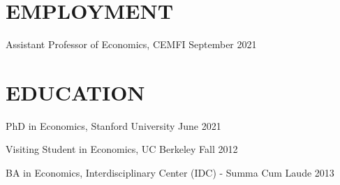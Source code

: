 \documentclass[margin]{res} %
\begin{document}
\begin{resume}


\section{EMPLOYMENT}

Assistant Professor of Economics, CEMFI \hfill September 2021


\section{EDUCATION}

PhD in Economics, Stanford University \hfill June 2021

Visiting Student in Economics, UC Berkeley  \hfill Fall 2012 

BA in Economics, Interdisciplinary Center (IDC) - Summa Cum Laude \hfill 2013

\begin{comment}
\section{DISSERTATION COMMITTEE}


\begin{multicols}{2}
	\begin{itemize}
		 \item[] Prof. Ran Abramitzky (Primary) \\
		Economics Department, Stanford University \\
		(650) 723-9276 \\
		\textcolor{blue}{ranabra@stanford.edu} \\

		 \item[] Asst. Prof. Petra Persson \\
		Economics Department, Stanford University \\
		(650) 723-4116 \\
		\textcolor{blue}{perssonp@stanford.edu} \\


\end{comment}
\end{resume}
\end{document}
